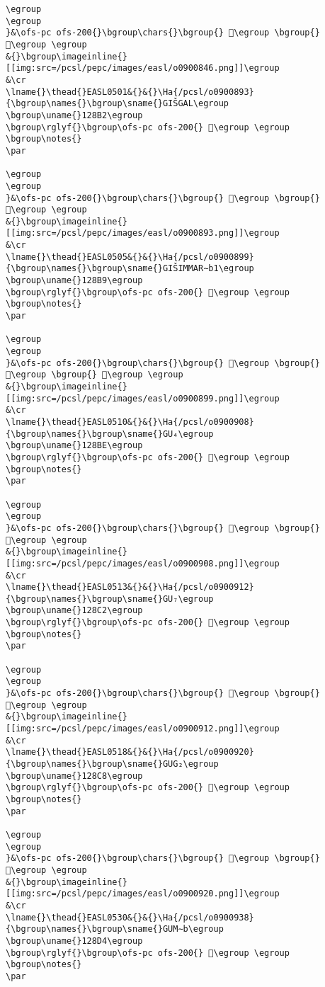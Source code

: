 \begin{verbatim}
\egroup
\egroup
}&\ofs-pc ofs-200{}\bgroup\chars{}\bgroup{} 𒢕\egroup \bgroup{} 𒢖\egroup \egroup
&{}\bgroup\imageinline{}[[img:src=/pcsl/pepc/images/easl/o0900846.png]]\egroup
&\cr
\lname{}\thead{}EASL0501&{}&{}\Ha{/pcsl/o0900893}{\bgroup\names{}\bgroup\sname{}GIŠGAL\egroup
\bgroup\uname{}128B2\egroup
\bgroup\rglyf{}\bgroup\ofs-pc ofs-200{} 𒢲\egroup \egroup
\bgroup\notes{}
\par 

\egroup
\egroup
}&\ofs-pc ofs-200{}\bgroup\chars{}\bgroup{} 𒢳\egroup \bgroup{} 𒢲\egroup \egroup
&{}\bgroup\imageinline{}[[img:src=/pcsl/pepc/images/easl/o0900893.png]]\egroup
&\cr
\lname{}\thead{}EASL0505&{}&{}\Ha{/pcsl/o0900899}{\bgroup\names{}\bgroup\sname{}GIŠIMMAR∼b1\egroup
\bgroup\uname{}128B9\egroup
\bgroup\rglyf{}\bgroup\ofs-pc ofs-200{} 𒢹\egroup \egroup
\bgroup\notes{}
\par 

\egroup
\egroup
}&\ofs-pc ofs-200{}\bgroup\chars{}\bgroup{} 𒢷\egroup \bgroup{} 𒢸\egroup \bgroup{} 𒢹\egroup \egroup
&{}\bgroup\imageinline{}[[img:src=/pcsl/pepc/images/easl/o0900899.png]]\egroup
&\cr
\lname{}\thead{}EASL0510&{}&{}\Ha{/pcsl/o0900908}{\bgroup\names{}\bgroup\sname{}GU₄\egroup
\bgroup\uname{}128BE\egroup
\bgroup\rglyf{}\bgroup\ofs-pc ofs-200{} 𒢾\egroup \egroup
\bgroup\notes{}
\par 

\egroup
\egroup
}&\ofs-pc ofs-200{}\bgroup\chars{}\bgroup{} 𒣁\egroup \bgroup{} 𒢾\egroup \egroup
&{}\bgroup\imageinline{}[[img:src=/pcsl/pepc/images/easl/o0900908.png]]\egroup
&\cr
\lname{}\thead{}EASL0513&{}&{}\Ha{/pcsl/o0900912}{\bgroup\names{}\bgroup\sname{}GU₇\egroup
\bgroup\uname{}128C2\egroup
\bgroup\rglyf{}\bgroup\ofs-pc ofs-200{} 𒣂\egroup \egroup
\bgroup\notes{}
\par 

\egroup
\egroup
}&\ofs-pc ofs-200{}\bgroup\chars{}\bgroup{} 𒣂\egroup \bgroup{} 𒣃\egroup \egroup
&{}\bgroup\imageinline{}[[img:src=/pcsl/pepc/images/easl/o0900912.png]]\egroup
&\cr
\lname{}\thead{}EASL0518&{}&{}\Ha{/pcsl/o0900920}{\bgroup\names{}\bgroup\sname{}GUG₂\egroup
\bgroup\uname{}128C8\egroup
\bgroup\rglyf{}\bgroup\ofs-pc ofs-200{} 𒣈\egroup \egroup
\bgroup\notes{}
\par 

\egroup
\egroup
}&\ofs-pc ofs-200{}\bgroup\chars{}\bgroup{} 𒣊\egroup \bgroup{} 𒣈\egroup \egroup
&{}\bgroup\imageinline{}[[img:src=/pcsl/pepc/images/easl/o0900920.png]]\egroup
&\cr
\lname{}\thead{}EASL0530&{}&{}\Ha{/pcsl/o0900938}{\bgroup\names{}\bgroup\sname{}GUM∼b\egroup
\bgroup\uname{}128D4\egroup
\bgroup\rglyf{}\bgroup\ofs-pc ofs-200{} 𒣔\egroup \egroup
\bgroup\notes{}
\par 


\end{verbatim}
